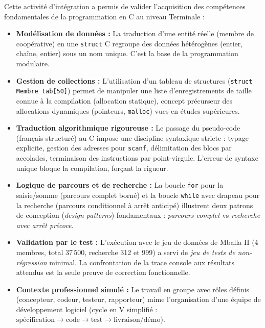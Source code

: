 \documentclass[11pt]{article}
\newcounter{popsec}
\newcounter{popsub}
\newcommand{\courssub}[1]{%
  \stepcounter{popsub}%
  \par\vspace{9pt}\noindent{\popxbold\fontsize{11.5}{13}\selectfont\color{popink}{\color{poporange}\thepopsec.\thepopsub}\hspace{6pt}#1}\par\nopagebreak\vspace{4pt}
}
\begin{document}
\courssub{Bilan de l'activité}
Cette activité d'intégration a permis de valider l'acquisition des compétences fondamentales de la programmation en C au niveau Terminale :
\begin{itemize}
    \item \textbf{Modélisation de données :} La traduction d'une entité réelle (membre de coopérative) en une \texttt{struct} C regroupe des données hétérogènes (entier, chaîne, entier) sous un nom unique. C'est la base de la programmation modulaire.
    \item \textbf{Gestion de collections :} L'utilisation d'un tableau de structures (\texttt{struct Membre tab[50]}) permet de manipuler une liste d'enregistrements de taille connue à la compilation (allocation statique), concept précurseur des allocations dynamiques (pointeurs, \texttt{malloc}) vues en études supérieures.
    \item \textbf{Traduction algorithmique rigoureuse :} Le passage du pseudo-code (français structuré) au C impose une discipline syntaxique stricte : typage explicite, gestion des adresses pour \texttt{scanf}, délimitation des blocs par accolades, terminaison des instructions par point-virgule. L'erreur de syntaxe unique bloque la compilation, forçant la rigueur.
    \item \textbf{Logique de parcours et de recherche :} La boucle \texttt{for} pour la saisie/somme (parcours complet borné) et la boucle \texttt{while} avec drapeau pour la recherche (parcours conditionnel à arrêt anticipé) illustrent deux patrons de conception (\emph{design patterns}) fondamentaux : \emph{parcours complet} vs \emph{recherche avec arrêt précoce}.
    \item \textbf{Validation par le test :} L'exécution avec le jeu de données de Mballa II (4 membres, total $37\,500$, recherche 312 et 999) a servi de \emph{jeu de tests de non-régression} minimal. La confrontation de la trace console aux résultats attendus est la seule preuve de correction fonctionnelle.
    \item \textbf{Contexte professionnel simulé :} Le travail en groupe avec rôles définis (concepteur, codeur, testeur, rapporteur) mime l'organisation d'une équipe de développement logiciel (cycle en V simplifié : $ \text{spécification} \to \text{code} \to \text{test} \to \text{livraison/démo} $).
\end{itemize}
\end{document}
